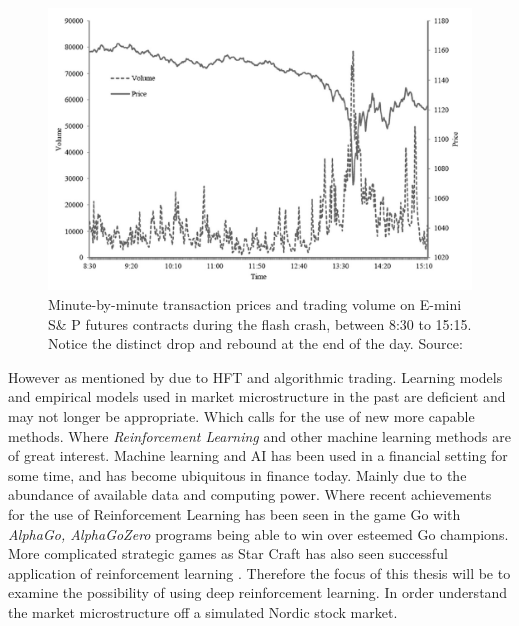 \documentclass{kththesis}
\theoremstyle{definition}
\begin{document}
\begin{figure}[ht]
    \centering
    \includegraphics[scale=.7]{flashcrash.PNG}
    \caption{Minute-by-minute transaction prices and trading volume on E-mini S\& P futures contracts during the flash crash, between 8:30 to 15:15. Notice the distinct drop and rebound at the end of the day. Source: \textcite{kirilenko2017flash} }
    \label{fig:1}
\end{figure}

However as mentioned by \textcite{o2015high} due to HFT and algorithmic trading. Learning models and empirical models used in market microstructure in the past are deficient and may not longer be appropriate. Which calls for the use of new more capable methods. Where \textit{Reinforcement Learning} and other machine learning methods are of great interest. Machine learning and AI has been used in a financial setting for some time, and has become ubiquitous in finance today. Mainly due to the abundance of available data and computing power. 
\newline
\newline
Where recent achievements for the use of Reinforcement Learning has been seen in the game Go with \textit{AlphaGo, AlphaGoZero} \parencite{silver2016mastering} programs being able to win over esteemed Go champions. More complicated strategic games as Star Craft has also seen successful application of reinforcement learning \parencite{vinyals2017starcraft}. Therefore the focus of this thesis will be to examine the possibility of using deep reinforcement learning. In order understand the market microstructure off a simulated Nordic stock market.

\end{document}
